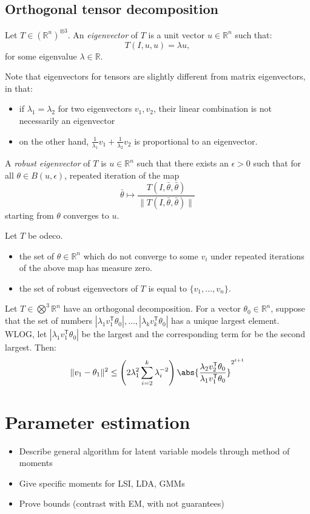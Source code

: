 \subsection{Orthogonal tensor decomposition}
\begin{definition}
Let $T \in (\mathbb{R}^n)^{\otimes 3}$. An \emph{eigenvector} of $T$ is a unit vector $u \in \mathbb{R}^n$ such that:
\[T(I,u,u) = \lambda u,\]
for some eigenvalue $\lambda \in \mathbb{R}$. 
\end{definition}

Note that eigenvectors for tensors are slightly different from matrix eigenvectors, in that:
\begin{itemize}
    \item if $\lambda_1 = \lambda_2$ for two eigenvectors $v_1,v_2$, their linear combination is not necessarily an eigenvector
    \item on the other hand, $\frac{1}{\lambda_1} v_1 + \frac{1}{\lambda_2} v_2$ is proportional to an eigenvector.
\end{itemize}

\begin{definition}
A \emph{robust eigenvector} of $T$ is $u \in \mathbb{R}^n$ such that there exists an $\epsilon > 0$ such that for all $\theta \in B(u,\epsilon)$, repeated iteration of the map
\[\bar{\theta} \mapsto \frac{T(I,\bar{\theta},\bar{\theta})}{\|T(I,\bar{\theta},\bar{\theta})\|}\]
starting from $\theta$ converges to $u$.
\end{definition}

\begin{theorem}
Let $T$ be odeco.
\begin{itemize}
    \item the set of $\theta \in \mathbb{R}^n$ which do not converge to some $v_i$ under repeated iterations of the above map has measure zero.
    \item the set of robust eigenvectors of $T$ is equal to $\{v_1,\dotsc, v_n\}$.
\end{itemize}
\end{theorem}

\begin{lemma}
Let $T \in \bigotimes^3 \mathbb{R}^n$ have an orthogonal decomposition. For a vector $\theta_0 \in \mathbb{R}^n$, suppose that the set of numbers $|\lambda_1 v_1^\mathsf{T}\theta_0|,\dotsc, |\lambda_k v_k ^\mathsf{T} \theta_0|$ has a unique largest element. WLOG, let $|\lambda_1 v_1^\mathsf{T}\theta_0|$ be the largest and the corresponding term for be the second largest. Then:
\[\|v_1 - \theta_1 \|^2 \leq \left(2\lambda_1^{2} \sum_{i=2}^k \lambda_i^{-2}\right)\abs{\frac{\lambda_2v_2^\mathsf{T} \theta_0}{\lambda_1v_1^\mathsf{T}\theta_0}}^{2^{t+1}}\]
\end{lemma}

\section{Parameter estimation}

\begin{itemize}
    \item Describe general algorithm for latent variable models through method of moments
    \item Give specific moments for LSI, LDA, GMMs
    \item Prove bounds (contrast with EM, with not guarantees)
\end{itemize}

